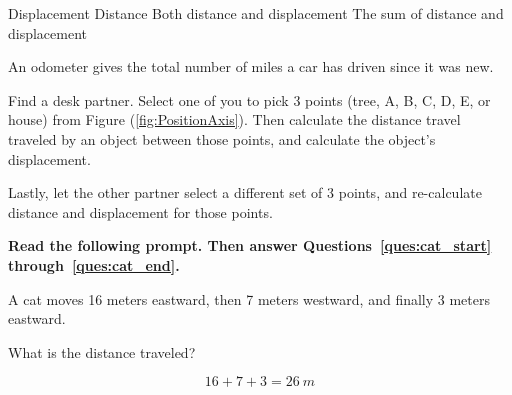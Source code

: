 \documentclass[]{exam}
\begin{document}
\begin{questions}
\begin{questions}
\begin{choices}
\choice Displacement
\CorrectChoice Distance
\choice Both distance and displacement
\choice The sum of distance and displacement
\end{choices}

\begin{solution}
An odometer gives the total number of miles a car has driven since it was new. 
\end{solution}

\question
Find a desk partner. Select one of you to pick 3 points (tree, A, B, C, D, E, or house) from Figure (\ref{fig:PositionAxis}). Then calculate the distance travel traveled by an object between those points, and calculate the object's displacement.

Lastly, let the other partner select a different set of 3 points, and re-calculate distance and displacement for those points. 

\clearpage
\begin{EnvUplevel}
\textbf{Read the following prompt. Then answer Questions~\ref{ques:cat_start} through~\ref{ques:cat_end}.} 
\end{EnvUplevel}
\vspace{-0.5em}

\begin{EnvUplevel}
A cat moves 16 meters eastward, then 7 meters westward, and finally 3 meters eastward.
\end{EnvUplevel}

\begin{figure}[h!]
    \centering
\end{figure}

\question \label{ques:cat_start}
What is the distance traveled?

\begin{solution}
\begin{equation*}
    16 + 7 + 3 = \SI{26}{m}
\end{equation*}
\end{solution}


\end{questions}
\end{questions}
\end{document}
